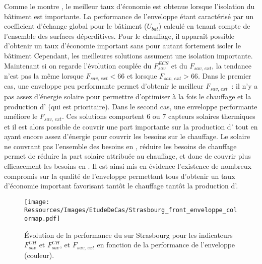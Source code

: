 Comme le montre , le meilleur taux d’économie est
obtenue lorsque l’isolation du bâtiment est importante. La performance de l’enveloppe
étant caractérisé par un coefficient d’échange global pour le bâtiment ($U_{bat}$) calculé
en tenant compte de l’ensemble des surfaces déperditives. Pour le chauffage, il apparaît
possible d’obtenir un taux d’économie important sans pour autant fortement isoler le
bâtiment Cependant, les meilleures solutions assument une isolation importante.
Maintenant si on regarde l’évolution couplée du $F_{sav}^{ECS}$ et du $F_{sav,\, ext}$, la
tendance n’est pas la même lorsque $F_{sav,\, ext} < 66$ et lorsque $F_{sav,\, ext} > 66$.
Dans le premier cas, une enveloppe peu performante permet d’obtenir le meilleur $F_{sav,\,ext}$~:
il n’y a pas assez d’énergie solaire pour permettre d’optimiser à la fois le
chauffage et la production d’ (qui est prioritaire). Dans le second cas, une
enveloppe performante améliore le $F_{sav,\, ext}$. Ces solutions comportent $6$ ou $7$
capteurs solaires thermiques et il est alors possible de couvrir une part importante sur
la production d’ tout en ayant encore assez d’énergie pour couvrir les besoins sur
le chauffage. Le solaire ne couvrant pas l’ensemble des besoins en
, réduire les besoins de chauffage permet de réduire la part solaire attribuée au
chauffage, et donc de couvrir plus efficacement les besoins en .
Il est ainsi mis en évidence l’existence de nombreux compromis sur la qualité de l’enveloppe
permettant tous d’obtenir un taux d’économie important favorisant tantôt le chauffage
tantôt la production d’.

\begin{figure}
    \centering
    \texttt{[image: Ressources/Images/EtudeDeCas/Strasbourg\_front\_enveloppe\_colormap.pdf]}
    \caption[Évolution de la performance du  en fonction de la qualité de l’enveloppe]
             {Évolution de la performance du  sur Strasbourg pour les indicateurs $F_{sav}^{CH}$
              et $F_{sav}^{CH}$, et $F_{sav,\,ext}$ en fonction de la performance de l’enveloppe (couleur).}
    \label{fig:pareto_enveloppe_strasbourg}
\end{figure}


